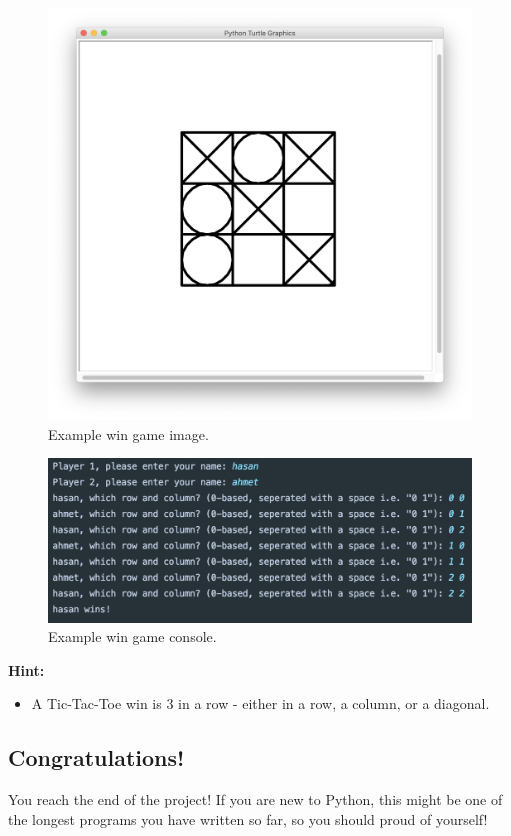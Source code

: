 \documentclass[a4paper]{article}
\begin{document}
\begin{figure}[!htb]
\centering
\includegraphics[width=1\textwidth]{end_game_figure.png}
\caption{Example win game image.}\label{fig:outputs}
\end{figure}

\begin{figure}[!htb]
\centering
\includegraphics[width=1\textwidth]{end_game_prompt.png}
\caption{Example win game console.}\label{fig:outputs}
\end{figure}

\textbf{Hint:}
\begin{itemize}
\item A Tic-Tac-Toe win is 3 in a row - either in a row, a column, or a diagonal.
\end{itemize}


\newpage
\subsection{Congratulations!}
You reach the end of the project! If you are new to Python, this might be one of the longest programs you have written so far, so you should proud of yourself!
\end{document}
